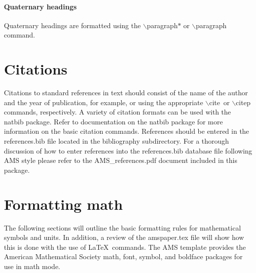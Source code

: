 \documentclass[12pt]{article}
\begin{document}
\paragraph*{Quaternary headings} %
Quaternary headings are formatted using the $\backslash$paragraph$*$ or $\backslash$paragraph command.

\section{Citations}
Citations to standard references in text should consist of the name of the author and the
year of publication, for example, \cite{Becker+Schmitz2003} or \citep{Becker+Schmitz2003} using the appropriate $\backslash$cite\ or $\backslash$citep commands, respectively. A variety of citation formats can be used with the natbib package. Refer to
documentation on the natbib package for more information on the basic citation
commands. References should be entered in the references.bib file located in the bibliography subdirectory. For a thorough discussion of how to enter references into the references.bib database file following AMS style please refer to the AMS\_references.pdf document included in this package.

\section{Formatting math}
The following sections will outline the basic formatting rules
for mathematical symbols and units.  In addition, a review of the amspaper.tex file
will show how this is done with the use of \LaTeX\ commands.  The AMS template provides the American Mathematical Society math, font, symbol, and boldface packages for use in math mode.
\end{document}
